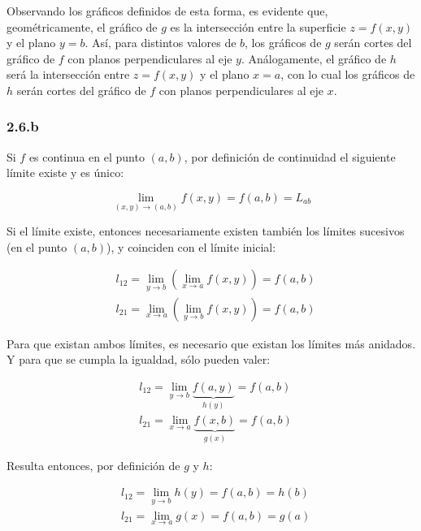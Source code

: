 \documentclass{article}
\begin{document}
Observando los gráficos definidos de esta forma, es evidente que, geométricamente, el gráfico de $g$ es la intersección entre la superficie $z = f(x,y)$ y el plano $y = b$. Así, para distintos valores de $b$, los gráficos de $g$ serán cortes del gráfico de $f$ con planos perpendiculares al eje $y$. Análogamente, el gráfico de $h$ será la intersección entre $z = f(x,y)$ y el plano $x = a$, con lo cual los gráficos de $h$ serán cortes del gráfico de $f$ con planos perpendiculares al eje $x$.

\subsubsection*{2.6.b}
\label{subsubsec:2.6.b}

Si $f$ es continua en el punto $(a,b)$, por definición de continuidad el siguiente límite existe y es único:

\begin{equation}
\lim_{(x,y) \rightarrow (a,b)} f(x,y) = f(a,b) = L_{ab}
\end{equation}

Si el límite existe, entonces necesariamente existen también los límites sucesivos (en el punto $(a,b)$), y coinciden con el límite inicial:

\begin{subequations}
\begin{align}
& l_{12} = \lim_{y \rightarrow b} \left( \lim_{x \rightarrow a} f(x,y) \right) = f(a,b) \\
& l_{21} = \lim_{x \rightarrow a} \left( \lim_{y \rightarrow b} f(x,y) \right) = f(a,b)
\end{align}
\end{subequations}

Para que existan ambos límites, es necesario que existan los límites más anidados. Y para que se cumpla la igualdad, sólo pueden valer:

\begin{subequations}
\begin{align}
& l_{12} = \lim_{y \rightarrow b} \underbrace{f(a,y)}_{h(y)} = f(a,b) \\
& l_{21} = \lim_{x \rightarrow a} \underbrace{f(x,b)}_{g(x)} = f(a,b)
\end{align}
\end{subequations}

Resulta entonces, por definición de $g$ y $h$:

\begin{subequations}
\begin{align}
& l_{12} = \lim_{y \rightarrow b} h(y) = f(a,b) = h(b) \\
& l_{21} = \lim_{x \rightarrow a} g(x) = f(a,b) = g(a)
\end{align}
\end{subequations}
\end{document}
